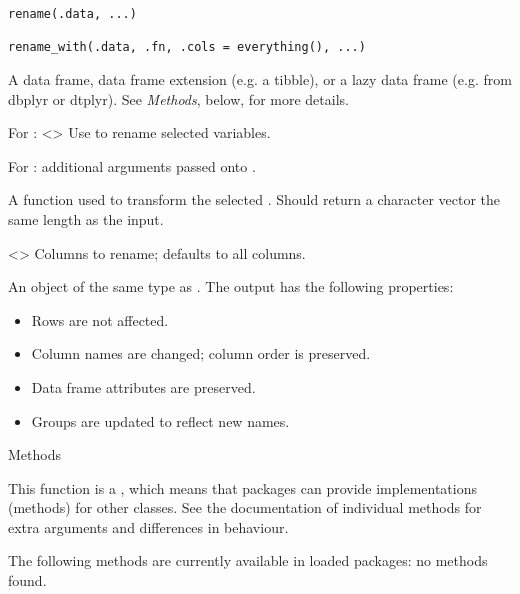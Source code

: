 \documentclass[a4paper]{book}
\begin{document}
%
\begin{Usage}
\begin{verbatim}
rename(.data, ...)

rename_with(.data, .fn, .cols = everything(), ...)
\end{verbatim}
\end{Usage}
%
\begin{Arguments}
\begin{ldescription}
\item[\code{.data}] A data frame, data frame extension (e.g. a tibble), or a
lazy data frame (e.g. from dbplyr or dtplyr). See \emph{Methods}, below, for
more details.

\item[\code{...}] For : <> Use
 to rename selected variables.

For : additional arguments passed onto .

\item[\code{.fn}] A function used to transform the selected . Should
return a character vector the same length as the input.

\item[\code{.cols}] <> Columns to rename;
defaults to all columns.
\end{ldescription}
\end{Arguments}
%
\begin{Value}
An object of the same type as . The output has the following
properties:
\begin{itemize}

\item{} Rows are not affected.
\item{} Column names are changed; column order is preserved.
\item{} Data frame attributes are preserved.
\item{} Groups are updated to reflect new names.

\end{itemize}

\end{Value}
%
\begin{Section}{Methods}

This function is a , which means that packages can provide
implementations (methods) for other classes. See the documentation of
individual methods for extra arguments and differences in behaviour.

The following methods are currently available in loaded packages:
no methods found.
\end{Section}
\end{document}
